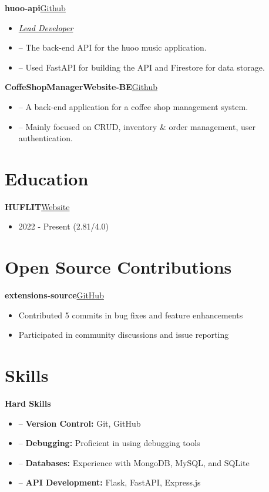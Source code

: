 \documentclass[a4paper,12pt]{article}
\newenvironment{itemList}[3][]
    {
    \noindent\hspace{1em}\textbf{#2}\hfill#3\\[3.75pt]
    \begin{minipage}[t]{\linewidth}
    \begin{itemize}[nosep,after=\strut, leftmargin=2em, itemsep=3pt,label={},#1]
    }
    {
    \end{itemize}
    \end{minipage}
    }
\newcommand{\listSubHeading}[1]{
    \item[] \noindent\hspace{-1em}\textit{#1}
    }
\begin{document}
\begin{itemList}{huoo-api}{\href{https://github.com/foxeiz/huoo-api}{Github}}
    \listSubHeading{\href{https://github.com/FoxeiZ/huoo-api/graphs/contributors}{\textcolor{black}{Lead Developer}}}
    \item -- The back-end API for the huoo music application.
    \item -- Used FastAPI for building the API and Firestore for data storage.
\end{itemList}

\begin{itemList}{CoffeShopManagerWebsite-BE}{\href{https://github.com/foxeiz/CoffeShopManagerWebsite-BE/}{Github}}
    \item -- A back-end application for a coffee shop management system.
    \item -- Mainly focused on CRUD, inventory \& order management, user authentication.
\end{itemList}


\section{Education}
\begin{itemList}{HUFLIT}{\href{https://huflit.edu.vn/}{Website}}
    \item 2022 - Present \hfill  (2.81/4.0)\\
\end{itemList}

\section{Open Source Contributions}
\begin{itemList}{extensions-source}{\href{https://github.com/keiyoushi/extensions-source}{GitHub}}
    \item Contributed 5 commits in bug fixes and feature enhancements
    \item Participated in community discussions and issue reporting
\end{itemList}

\newpage
\section{Skills}
\begin{itemList}[itemsep=5pt]{Hard Skills}{}
    \item -- \textbf{Version Control:} Git, GitHub
    \item -- \textbf{Debugging:} Proficient in using debugging tools
    \item -- \textbf{Databases:} Experience with MongoDB, MySQL, and SQLite
    \item -- \textbf{API Development:} Flask, FastAPI, Express.js
\end{itemList}
\end{document}
